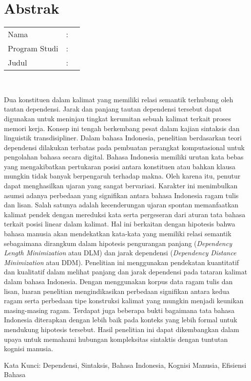%
%
%

\chapter*{Abstrak}

\vspace*{0.2cm}

\noindent \begin{tabular}{l l p{10cm}}
	Nama&: & \penulis \\
	Program Studi&: & \program \\
	Judul&: & \judul \\
\end{tabular} \\ 

\vspace*{1cm}

Dua konstituen dalam kalimat yang memiliki relasi semantik terhubung oleh tautan dependensi. Jarak dan panjang tautan dependensi tersebut dapat digunakan untuk meninjau tingkat kerumitan sebuah kalimat terkait proses memori kerja. Konsep ini tengah berkembang pesat dalam kajian sintaksis dan linguistik transdisipliner. Dalam bahasa Indonesia, penelitian berdasarkan teori dependensi dilakukan terbatas pada pembuatan perangkat komputasional untuk pengolahan bahasa secara digital. Bahasa Indonesia memiliki urutan kata bebas yang mengakibatkan pertukaran posisi antara konstituen atau bahkan klausa mungkin tidak banyak berpengaruh terhadap makna. Oleh karena itu, penutur dapat menghasilkan ujaran yang sangat bervariasi. Karakter ini menimbulkan asumsi adanya perbedaan yang signifikan antara bahasa Indonesia ragam tulis dan lisan. Salah satunya adalah kecenderungan ujaran spontan memanfaatkan kalimat pendek dengan mereduksi kata serta pergeseran dari aturan tata bahasa terkait posisi linear dalam kalimat. Hal ini berkaitan dengan hipotesis bahwa bahasa manusia akan mendekatkan kata-kata yang memiliki relasi semantik sebagaimana dirangkum dalam hipotesis pengurangan panjang (\textit{Dependency Length Minimization} atau DLM) dan jarak dependensi (\textit{Dependency Distance Minimization} atau DDM). Penelitian ini menggunakan pendekatan kuantitatif dan kualitatif dalam melihat panjang dan jarak dependensi pada tataran kalimat dalam bahasa Indonesia. Dengan menggunakan korpus data ragam tulis dan lisan, luaran penelitian mengindikasikan perbedaan signifikan antara kedua ragam serta perbedaan tipe konstruksi kalimat yang mungkin menjadi keunikan masing-masing ragam. Terdapat juga beberapa bukti bagaimana tata bahasa Indonesia diterapkan dengan lebih baik pada konteks yang lebih formal untuk mendukung hipotesis tersebut. Hasil penelitian ini dapat dikembangkan dalam upaya untuk memahami hubungan kompleksitas sintaktis dengan tuntutan kognisi manusia.

\vspace*{0.5cm}

\noindent Kata Kunci: 
\newline
\noindent Dependensi, Sintaksis, Bahasa Indonesia, Kognisi Manusia, Efisiensi Bahasa

\newpage